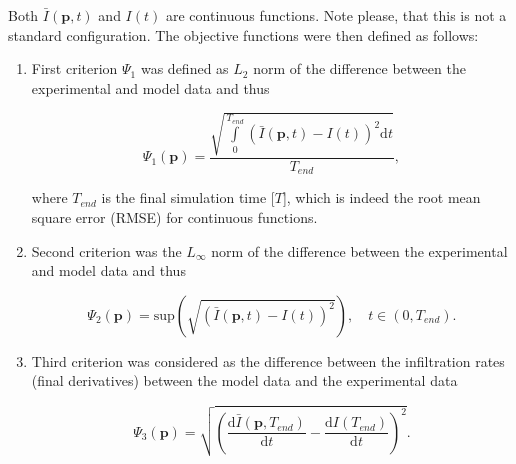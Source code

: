 \documentclass[review,times,3p,10pt]{elsarticle}
\newenvironment{lineq}
    {\begin{linenomath*}
    \begin{equation}
    }
    { 
    \end{equation} 
    \end{linenomath*}
    }
\newcommand{\dd}{\mathrm{d}}
\renewcommand{\vec}{\mathbf}
\begin{document}
 Both $\bar{I}(\vec{p},t)$ and $I(t)$ are continuous functions. Note please, that this is not a standard configuration. The objective functions were then defined as follows:
\begin{enumerate}[label={\bf \Roman*}.]
\item First criterion $\Psi_1$ was defined as $L_2$ norm of the difference between the  experimental and model data and thus
\begin{lineq}
\label{objektiva1}
\Psi_1 (\vec{p}) = \frac{\sqrt{\int\limits_0^{T_{end}} \left( \bar{I}(\vec{p},t) - I(t) \right)^2 \dd t}}{T_{end}},
\end{lineq}
where $T_{end}$ is the final simulation time [$T$], which is indeed the root mean square error (RMSE) for continuous functions. 
\item Second criterion was the $L_{\infty}$ norm of the difference between the experimental and model data and thus
\begin{lineq}
\label{objektiva2}
\Psi_2 (\vec{p}) = \mathrm{sup} \left( \sqrt{\left( \bar{I}(\vec{p},t) - I(t) \right)^2} \right), \quad  t \in (0, T_{end}).
\end{lineq}
\item Third criterion was considered as the difference between the infiltration rates (final derivatives) between the model data and the experimental data
\begin{lineq}
\label{objektiva3}
\Psi_3 (\vec{p}) =  \sqrt{\left( \frac{\dd \bar{I}(\vec{p},T_{end})}{\dd t} - \frac{\dd I(T_{end})}{\dd t} \right)^2}.
\end{lineq}


\end{enumerate}
\end{document}
